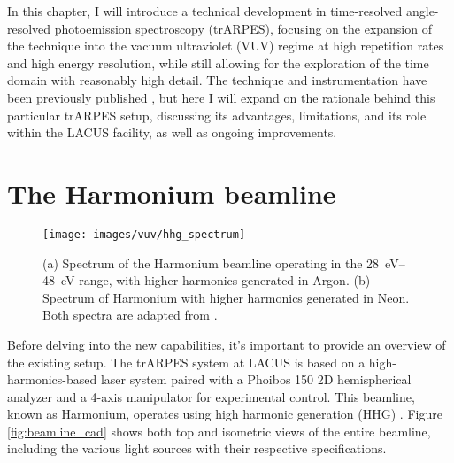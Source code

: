 In this chapter, I will introduce a technical development in time-resolved angle-resolved photoemission spectroscopy (trARPES), focusing on the expansion of the technique into the vacuum ultraviolet (VUV) regime at high repetition rates and high energy resolution, while still allowing for the exploration of the time domain with reasonably high detail.
The technique and instrumentation have been previously published \cite{hellbruck_high-resolution_2024}, but here I will expand on the rationale behind this particular trARPES setup, discussing its advantages, limitations, and its role within the LACUS facility, as well as ongoing improvements.

\section{The Harmonium beamline}

\begin{figure}
	\centering
	\texttt{[image: images/vuv/hhg\_spectrum]}
	\caption{(a) Spectrum of the Harmonium beamline operating in the \qtyrange{28}{48}{\electronvolt} range, with higher harmonics generated in Argon. (b) Spectrum of Harmonium with higher harmonics generated in Neon. Both spectra are adapted from \cite{ojeda_harmonium_2015}.}
	\label{fig:hhgspectrum}
\end{figure}


Before delving into the new capabilities, it’s important to provide an overview of the existing setup.
The trARPES system at LACUS is based on a high-harmonics-based laser system paired with a Phoibos 150 2D hemispherical analyzer and a 4-axis manipulator for experimental control.
This beamline, known as Harmonium, operates using high harmonic generation (HHG) \cite{arrell_harmonium_2017}.
Figure \ref{fig:beamline_cad} shows both top and isometric views of the entire beamline, including the various light sources with their respective specifications.

